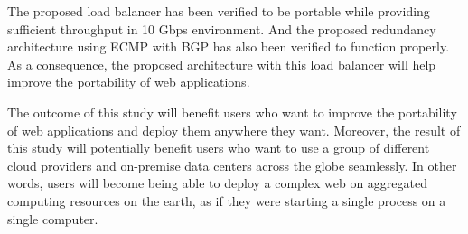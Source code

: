 The proposed load balancer has been verified to be portable while providing  sufficient throughput in 10 Gbps environment.
And the proposed redundancy architecture using ECMP with BGP has also been verified to function properly.
As a consequence, the proposed architecture with this load balancer will help improve the portability of web applications.


The outcome of this study will benefit users who want to improve the portability of web applications and deploy them anywhere they want.
Moreover, the result of this study will potentially benefit users who want to use a group of different cloud providers and on-premise data centers across the globe seamlessly.
In other words, users will become being able to deploy a complex web  on aggregated computing resources on the earth, as if they were starting a single process on a single computer.

